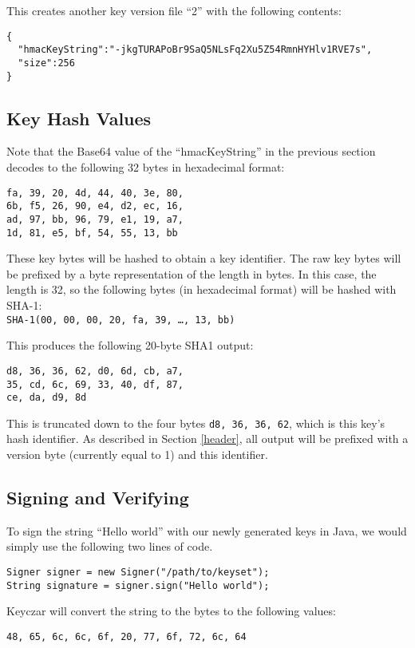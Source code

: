 \documentclass{llncs}
\begin{document}
This creates another key version file ``2'' with the following contents:
\begin{verbatim}
{
  "hmacKeyString":"-jkgTURAPoBr9SaQ5NLsFq2Xu5Z54RmnHYHlv1RVE7s",
  "size":256
}
\end{verbatim}

\subsection{Key Hash Values}

Note that the Base64 value of the ``hmacKeyString'' in the previous
section decodes to the following 32 bytes in hexadecimal format:
\begin{verbatim}
fa, 39, 20, 4d, 44, 40, 3e, 80,
6b, f5, 26, 90, e4, d2, ec, 16,
ad, 97, bb, 96, 79, e1, 19, a7,
1d, 81, e5, bf, 54, 55, 13, bb
\end{verbatim}

These key bytes will be hashed to obtain a key identifier. The raw key bytes
will be prefixed by a byte representation of the length in bytes. In this case,
the length is 32, so the following bytes (in hexadecimal format) will be
hashed with SHA-1:\\ {\tt  SHA-1(00, 00, 00, 20, fa, 39, \ldots, 13, bb)}

This produces the following 20-byte SHA1 output:
\begin{verbatim}
d8, 36, 36, 62, d0, 6d, cb, a7,
35, cd, 6c, 69, 33, 40, df, 87,
ce, da, d9, 8d
\end{verbatim}

This is truncated down to the four bytes {\tt d8, 36, 36, 62}, which is
this key's hash identifier. As described in Section \ref{header}, all output
will be prefixed with a version byte (currently equal to 1) and this identifier.

\subsection{Signing and Verifying} 

To sign the string ``Hello world'' with our newly generated keys in Java, we
would simply use the following two lines of code.

\begin{verbatim}
Signer signer = new Signer("/path/to/keyset"); 
String signature = signer.sign("Hello world");
\end{verbatim}

Keyczar will convert the string to the bytes to the following values:
\begin{verbatim}
48, 65, 6c, 6c, 6f, 20, 77, 6f, 72, 6c, 64
\end{verbatim} 
\end{document}
